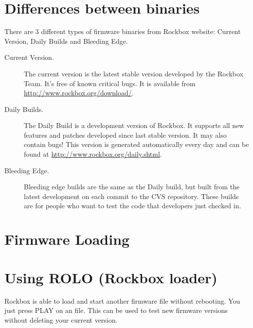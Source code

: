 \section{\label{ref:PartISection1}Differences between binaries}
There are 3 different types of firmware binaries from Rockbox website: 
Current Version, Daily Builds and Bleeding Edge.

\begin{description}
\item[Current Version.] The current version is the latest stable version
developed by the Rockbox Team. It's free of known critical bugs.  It is
available from \url{http://www.rockbox.org/download/}.
\item[Daily Builds.] The Daily Build is a development version of Rockbox. It
supports all new features and patches developed since last stable version. It
may also contain bugs! This version is generated automatically every day 
and can be found at \url{http://www.rockbox.org/daily.shtml}.
\item[Bleeding Edge.] Bleeding edge builds are the same as the Daily build, 
but built from the latest development on each commit to the CVS repository.
These builds are for people who want to test the code that developers just
checked in.
\end{description}


\section{\label{ref:FirmwareLoading}Firmware Loading}

\section{\label{ref:using_rolo}Using ROLO (Rockbox loader)}
Rockbox is able to load and start another firmware file without rebooting. 
You just press PLAY on an 
file. This can be used to test new firmware versions without deleting your
current version.

